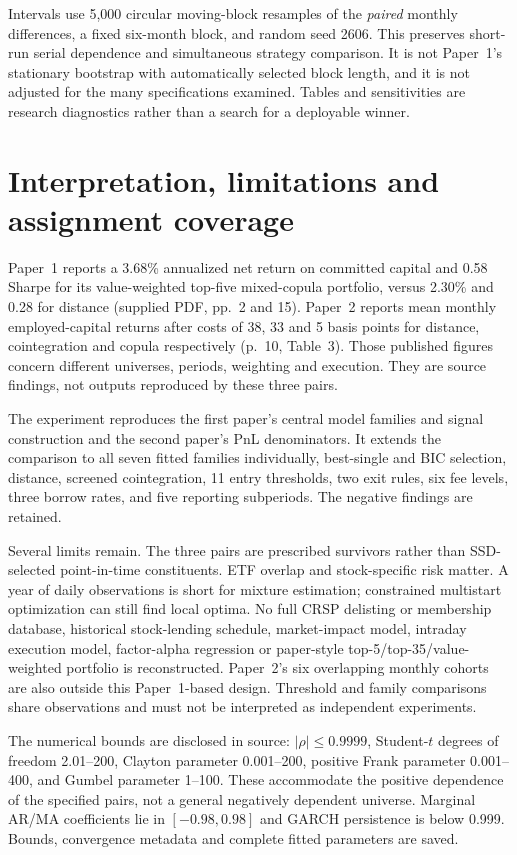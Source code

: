 \documentclass[11pt,letterpaper]{article}
\begin{document}
Intervals use 5,000 circular moving-block resamples of the \emph{paired} monthly differences, a fixed six-month block, and random seed 2606. This preserves short-run serial dependence and simultaneous strategy comparison. It is not Paper~1's stationary bootstrap with automatically selected block length, and it is not adjusted for the many specifications examined. Tables and sensitivities are research diagnostics rather than a search for a deployable winner.

\section{Interpretation, limitations and assignment coverage}
Paper~1 reports a 3.68\% annualized net return on committed capital and 0.58 Sharpe for its value-weighted top-five mixed-copula portfolio, versus 2.30\% and 0.28 for distance (supplied PDF, pp.~2 and 15). Paper~2 reports mean monthly employed-capital returns after costs of 38, 33 and 5 basis points for distance, cointegration and copula respectively (p.~10, Table~3). Those published figures concern different universes, periods, weighting and execution. They are source findings, not outputs reproduced by these three pairs.

The experiment reproduces the first paper's central model families and signal construction and the second paper's PnL denominators. It extends the comparison to all seven fitted families individually, best-single and BIC selection, distance, screened cointegration, 11 entry thresholds, two exit rules, six fee levels, three borrow rates, and five reporting subperiods. The negative findings are retained.

Several limits remain. The three pairs are prescribed survivors rather than SSD-selected point-in-time constituents. ETF overlap and stock-specific risk matter. A year of daily observations is short for mixture estimation; constrained multistart optimization can still find local optima. No full CRSP delisting or membership database, historical stock-lending schedule, market-impact model, intraday execution model, factor-alpha regression or paper-style top-5/top-35/value-weighted portfolio is reconstructed. Paper~2's six overlapping monthly cohorts are also outside this Paper~1-based design. Threshold and family comparisons share observations and must not be interpreted as independent experiments.

The numerical bounds are disclosed in source: $|\rho|\leq0.9999$, Student-$t$ degrees of freedom 2.01--200, Clayton parameter 0.001--200, positive Frank parameter 0.001--400, and Gumbel parameter 1--100. These accommodate the positive dependence of the specified pairs, not a general negatively dependent universe. Marginal AR/MA coefficients lie in $[-0.98,0.98]$ and GARCH persistence is below 0.999. Bounds, convergence metadata and complete fitted parameters are saved.
\end{document}
